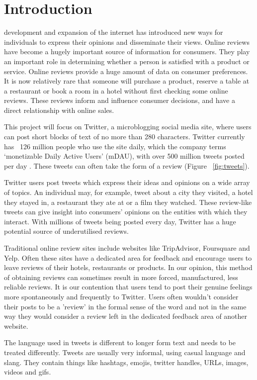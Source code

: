 \section{Introduction}
 development and expansion of the internet has introduced new ways for individuals to express their opinions and disseminate their views. Online reviews have become a hugely important source of information for consumers. They play an important role in determining whether a person is satisfied with a product or service. Online reviews provide a huge amount of data on consumer preferences. It is now relatively rare that someone will purchase a product, reserve a table at a restaurant or book a room in a hotel without first checking some online reviews. These reviews inform and influence consumer decisions, and have a direct relationship with online sales. 

This project will focus on Twitter, a microblogging social media site, where users can post short blocks of text of no more than 280 characters. Twitter currently has ~126 million people who use the site daily, which the company terms `monetizable Daily Active Users' (mDAU), with over 500 million tweets posted per day \cite{Twitter2019}. These tweets can often take the form of a review (Figure ~\ref{fig:tweets}).

Twitter users post tweets which express their ideas and opinions on a wide array of topics. An individual may, for example, tweet about a city they visited, a hotel they stayed in, a restaurant they ate at or a film they watched. These review-like tweets can give insight into consumers' opinions on the entities with which they interact. With millions of tweets being posted every day, Twitter has a huge potential source of underutilised reviews.

Traditional online review sites include websites like TripAdvisor, Foursquare and Yelp. Often these sites have a dedicated area for feedback and encourage users to leave reviews of their hotels, restaurants or products. In our opinion, this method of obtaining reviews can sometimes result in more forced, manufactured, less reliable reviews. It is our contention that users tend to post their genuine feelings more spontaneously and frequently to Twitter. Users often wouldn't consider their posts to be a 'review' in the formal sense of the word and not in the same way they would consider a review left in the dedicated feedback area of another website.

The language used in tweets is different to longer form text and needs to be treated differently. Tweets are usually very informal, using casual language and slang. They contain things like hashtags, emojis, twitter handles, URLs, images, videos and gifs.

